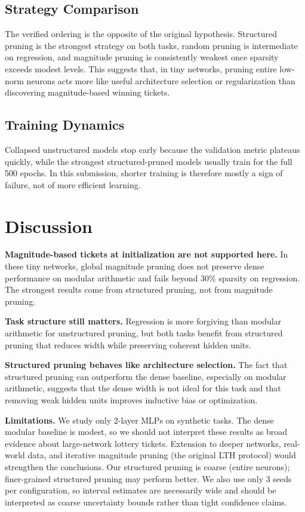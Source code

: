 \documentclass[11pt,a4paper]{article}
\begin{document}
\subsection{Strategy Comparison}

The verified ordering is the opposite of the original hypothesis. Structured pruning is the strongest strategy on both tasks, random pruning is intermediate on regression, and magnitude pruning is consistently weakest once sparsity exceeds modest levels. This suggests that, in tiny networks, pruning entire low-norm neurons acts more like useful architecture selection or regularization than discovering magnitude-based winning tickets.

\subsection{Training Dynamics}

Collapsed unstructured models stop early because the validation metric plateaus quickly, while the strongest structured-pruned models usually train for the full 500 epochs. In this submission, shorter training is therefore mostly a sign of failure, not of more efficient learning.

\section{Discussion}

\textbf{Magnitude-based tickets at initialization are not supported here.} In these tiny networks, global magnitude pruning does not preserve dense performance on modular arithmetic and fails beyond 30\% sparsity on regression. The strongest results come from structured pruning, not from magnitude pruning.

\textbf{Task structure still matters.} Regression is more forgiving than modular arithmetic for unstructured pruning, but both tasks benefit from structured pruning that reduces width while preserving coherent hidden units.

\textbf{Structured pruning behaves like architecture selection.} The fact that structured pruning can outperform the dense baseline, especially on modular arithmetic, suggests that the dense width is not ideal for this task and that removing weak hidden units improves inductive bias or optimization.

\textbf{Limitations.} We study only 2-layer MLPs on synthetic tasks. The dense modular baseline is modest, so we should not interpret these results as broad evidence about large-network lottery tickets. Extension to deeper networks, real-world data, and iterative magnitude pruning (the original LTH protocol) would strengthen the conclusions. Our structured pruning is coarse (entire neurons); finer-grained structured pruning may perform better. We also use only 3 seeds per configuration, so interval estimates are necessarily wide and should be interpreted as coarse uncertainty bounds rather than tight confidence claims.
\end{document}
